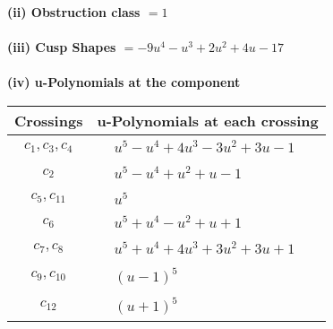 \documentclass[1p]{elsarticle_modified}
\theoremstyle{definition}
\begin{document}
\flushleft \textbf{(ii) Obstruction class $= 1$}\\~\\
\flushleft \textbf{(iii) Cusp Shapes $= -9 u^4- u^3+2 u^2+4 u-17$}\\~\\
\newpage\renewcommand{\arraystretch}{1}
\flushleft \textbf{(iv) u-Polynomials at the component}\newline \\
\begin{tabular}{m{50pt}|m{274pt}}
Crossings & \hspace{64pt}u-Polynomials at each crossing \\
\hline $$\begin{aligned}c_{1},c_{3},c_{4}\end{aligned}$$&$\begin{aligned}
&u^5- u^4+4 u^3-3 u^2+3 u-1
\end{aligned}$\\
\hline $$\begin{aligned}c_{2}\end{aligned}$$&$\begin{aligned}
&u^5- u^4+u^2+u-1
\end{aligned}$\\
\hline $$\begin{aligned}c_{5},c_{11}\end{aligned}$$&$\begin{aligned}
&u^5
\end{aligned}$\\
\hline $$\begin{aligned}c_{6}\end{aligned}$$&$\begin{aligned}
&u^5+u^4- u^2+u+1
\end{aligned}$\\
\hline $$\begin{aligned}c_{7},c_{8}\end{aligned}$$&$\begin{aligned}
&u^5+u^4+4 u^3+3 u^2+3 u+1
\end{aligned}$\\
\hline $$\begin{aligned}c_{9},c_{10}\end{aligned}$$&$\begin{aligned}
&(u-1)^5
\end{aligned}$\\
\hline $$\begin{aligned}c_{12}\end{aligned}$$&$\begin{aligned}
&(u+1)^5
\end{aligned}$\\
\hline
\end{tabular}\\~\\
\end{document}
